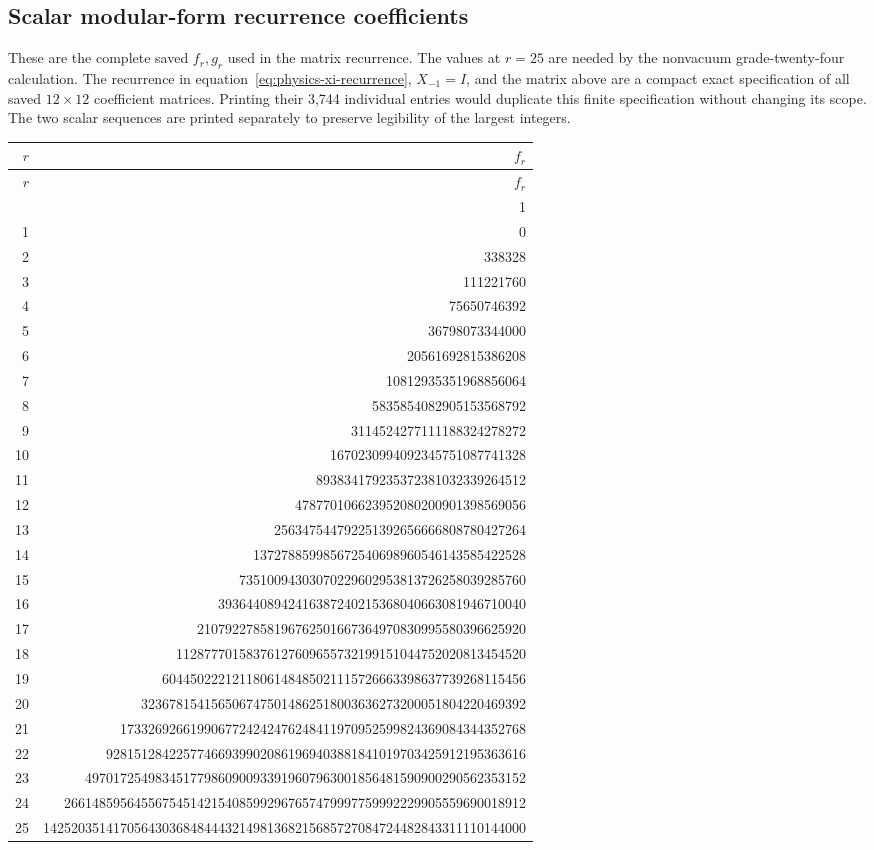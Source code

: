 \subsection{Scalar modular-form recurrence coefficients}
These are the complete saved $f_r,g_r$ used in the matrix recurrence.
The values at $r=25$ are needed by the nonvacuum grade-twenty-four
calculation. The recurrence in equation~\ref{eq:physics-xi-recurrence},
$X_{-1}=I$, and the matrix above are a compact exact specification of all
saved $12\times12$ coefficient matrices. Printing their 3,744 individual
entries would duplicate this finite specification without changing its
scope.
The two scalar sequences are printed separately to preserve legibility of the largest integers.

\begingroup\scriptsize
\setlength{\tabcolsep}{5pt}
\begin{longtable}{@{}rr@{}}
\toprule
$r$ & $f_r$\\
\midrule\endfirsthead
\toprule
$r$ & $f_r$\\
\midrule\endhead
\bottomrule\endfoot
0 & 1\\
1 & 0\\
2 & 338328\\
3 & 111221760\\
4 & 75650746392\\
5 & 36798073344000\\
6 & 20561692815386208\\
7 & 10812935351968856064\\
8 & 5835854082905153568792\\
9 & 3114524277111188324278272\\
10 & 1670230994092345751087741328\\
11 & 893834179235372381032339264512\\
12 & 478770106623952080200901398569056\\
13 & 256347544792251392656666808780427264\\
14 & 137278859985672540698960546143585422528\\
15 & 73510094303070229602953813726258039285760\\
16 & 39364408942416387240215368040663081946710040\\
17 & 21079227858196762501667364970830995580396625920\\
18 & 11287770158376127609655732199151044752020813454520\\
19 & 6044502221211806148485021115726663398637739268115456\\
20 & 3236781541565067475014862518003636273200051804220469392\\
21 & 1733269266199067724242476248411970952599824369084344352768\\
22 & 928151284225774669399020861969403881841019703425912195363616\\
23 & 497017254983451779860900933919607963001856481590900290562353152\\
24 & 266148595645567545142154085992967657479997759992229905559690018912\\
25 & 142520351417056430368484443214981368215685727084724482843311110144000\\
\end{longtable}
\endgroup

